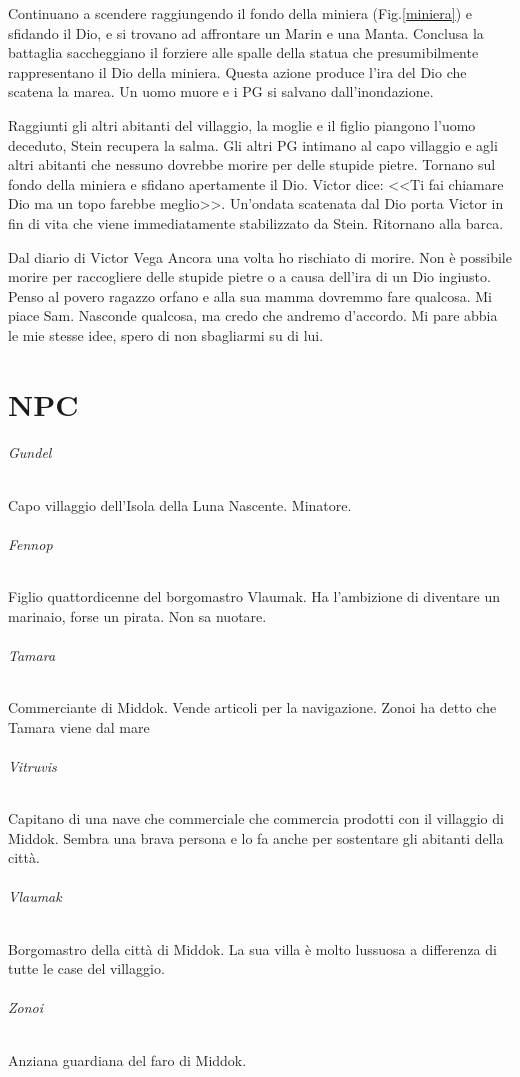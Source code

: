 \documentclass[letterpaper,twocolumn,openany, nodeprecatedcode, nomultitoc]{dndbook}
\begin{document}
Continuano a scendere raggiungendo il fondo della miniera (Fig.\ref{miniera}) e sfidando il Dio, e si trovano ad affrontare un Marin e una Manta. Conclusa la battaglia saccheggiano il forziere alle spalle della statua che presumibilmente rappresentano il Dio della miniera. Questa azione produce l'ira del Dio che scatena la marea. Un uomo muore e i PG si salvano dall'inondazione.

Raggiunti gli altri abitanti del villaggio, la moglie e il figlio piangono l'uomo deceduto, Stein recupera la salma. Gli altri PG intimano al capo villaggio e agli altri abitanti che nessuno dovrebbe morire per delle stupide pietre. Tornano sul fondo della miniera e sfidano apertamente il Dio. Victor dice: <<Ti fai chiamare Dio ma un topo farebbe meglio>>. Un'ondata scatenata dal Dio porta Victor in fin di vita che viene immediatamente stabilizzato da Stein. Ritornano alla barca.
\begin{DndComment}{Dal diario di Victor Vega}
Ancora una volta ho rischiato di morire. Non è possibile morire per raccogliere delle stupide pietre o a causa dell'ira di un Dio ingiusto. Penso al povero ragazzo orfano e alla sua mamma dovremmo fare qualcosa. Mi piace Sam. Nasconde qualcosa, ma credo che andremo d'accordo. Mi pare abbia le mie stesse idee, spero di non sbagliarmi su di lui.
\end{DndComment}


\chapter{NPC}

\subparagraph{Gundel} Capo villaggio dell'Isola della Luna Nascente. Minatore.

\subparagraph{Fennop} Figlio quattordicenne del borgomastro Vlaumak. Ha l'ambizione di diventare un marinaio, forse un pirata. Non sa nuotare.

\subparagraph{Tamara} Commerciante di Middok. Vende articoli per la navigazione. Zonoi ha detto che Tamara viene dal mare

\subparagraph{Vitruvis} Capitano di una nave che commerciale che commercia prodotti con il villaggio di Middok. Sembra una brava persona e lo fa anche per sostentare gli abitanti della città.

\subparagraph{Vlaumak} Borgomastro della città di Middok. La sua villa è molto lussuosa a differenza di tutte le case del villaggio.

\subparagraph{Zonoi} Anziana guardiana del faro di Middok.
\end{document}
